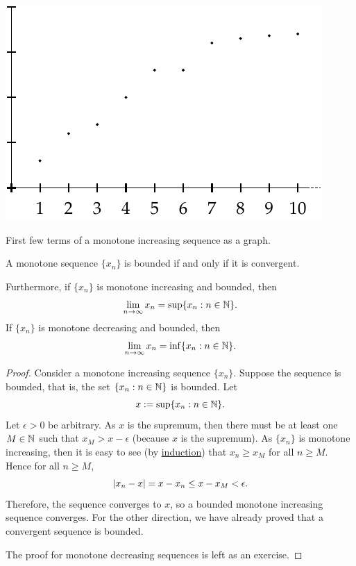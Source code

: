 \begin{myfigureht}
\includegraphics{figures/sequence-increasing}
\caption{First few terms of a monotone increasing sequence as a
graph.\label{figsequenceincreasing}}
\end{myfigureht}

\begin{prop} \label{prop:monotoneconv}
A monotone sequence $\{ x_n \}$ is bounded if and only if it is convergent.

Furthermore, if $\{ x_n \}$ is monotone increasing and bounded, then
\begin{equation*}
\lim_{n\to \infty} x_n = \sup \{ x_n : n \in {\mathbb{N}} \} .
\end{equation*}
If $\{ x_n \}$ is monotone decreasing and bounded, then
\begin{equation*}
\lim_{n\to \infty} x_n = \inf \{ x_n : n \in {\mathbb{N}} \} .
\end{equation*}
\end{prop}

\begin{proof}
Consider a monotone increasing sequence $\{ x_n \}$.  Suppose 
the sequence is bounded,
that is,
the set $\{ x_n : n \in  {\mathbb{N}} \}$ is bounded.  Let
\begin{equation*}
x := \sup \{ x_n : n \in {\mathbb{N}} \} .
\end{equation*}
Let $\epsilon > 0$ be arbitrary.  As $x$ is the supremum, then
there must be at least one $M \in {\mathbb{N}}$ such that $x_{M} > x-\epsilon$
(because $x$ is the supremum).  As $\{ x_n \}$ is monotone increasing,
then it is easy to see (by \hyperref[induction:thm]{induction}) that
$x_n \geq x_{M}$ for all $n \geq M$.  Hence for all $n \geq M$,
\begin{equation*}
\left\lvert {x_n-x} \right\rvert = x-x_n \leq x-x_{M} < \epsilon  .
\end{equation*}
Therefore, the sequence converges to $x$, so a bounded monotone increasing
sequence converges.
For the other direction, we have already proved that a convergent sequence
is bounded.

The proof for monotone decreasing sequences is left as an exercise.
\end{proof}

